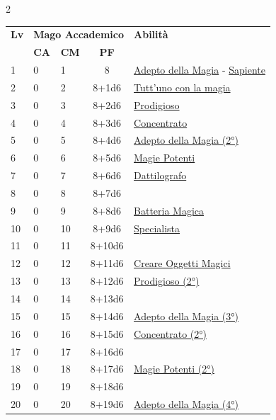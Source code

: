 {\begin{multicols}{2}

\noindent\begin{tabularx}{\linewidth}{p{0.55cm}|p{0.55cm}p{0.55cm}c|X|}
	\toprule
 \rowcolor{gray!20}	\textbf{Lv} & \multicolumn{3}{c|}{\textbf{Mago Accademico}} & \textbf{Abilità} \\
& \centering\arraybackslash \textbf{CA} & \centering\arraybackslash \textbf{CM} & \centering\arraybackslash \textbf{PF} & \\
	\toprule
	1 & 0 & 1 & 8 & \hyperlink{Adepto della Magia}{Adepto della Magia} - \hyperlink{Sapiente}{Sapiente}\\
	\rowcolor{gray!20}2 & 0 & 2 & 8+1d6 & \hyperlink{Tutt'uno con la magia}{Tutt'uno con la magia}\\
	3 & 0 & 3 & 8+2d6 & \hyperlink{Prodigioso}{Prodigioso}\\
	\rowcolor{gray!20}4 & 0 & 4 & 8+3d6 & \hyperlink{Concentrato}{Concentrato}\\
	5 & 0 & 5 & 8+4d6 & \hyperlink{Adepto della Magia}{Adepto della Magia (2°)}\\
	\rowcolor{gray!20}6 & 0 & 6 & 8+5d6 & \hyperlink{Magie Potenti}{Magie Potenti}\\
	7 & 0 & 7 & 8+6d6 & \hyperlink{Dattilografo}{Dattilografo}\\
	\rowcolor{gray!20}8 & 0 & 8 & 8+7d6 & \\
	9 & 0 & 9 & 8+8d6 & \hyperlink{Batteria Magica}{Batteria Magica}\\
	\rowcolor{gray!20}10 & 0 & 10 & 8+9d6 & \hyperlink{Specialista}{Specialista}\\
	11 & 0 & 11 & 8+10d6 & \\
	\rowcolor{gray!20}12 & 0 & 12 & 8+11d6 & \hyperlink{Creare Oggetti Magici}{Creare Oggetti Magici}\\
	13 & 0 & 13 & 8+12d6 & \hyperlink{Prodigioso}{Prodigioso (2°)}\\
	\rowcolor{gray!20}14 & 0 & 14 & 8+13d6 & \\
	15 & 0 & 15 & 8+14d6 & \hyperlink{Adepto della Magia}{Adepto della Magia (3°)}\\
	\rowcolor{gray!20}16 & 0 & 16 & 8+15d6 & \hyperlink{Concentrato}{Concentrato (2°)}\\
	17 & 0 & 17 & 8+16d6 & \\
	\rowcolor{gray!20}18 & 0 & 18 & 8+17d6 & \hyperlink{Magie Potenti}{Magie Potenti (2°)}\\
	19 & 0 & 19 & 8+18d6 & \\
	\rowcolor{gray!20}20 & 0 & 20 & 8+19d6 & \hyperlink{Adepto della Magia}{Adepto della Magia (4°)}\\
\end{tabularx}


\end{multicols}}
